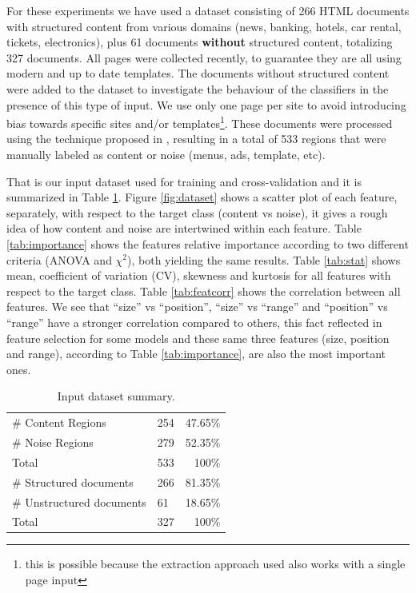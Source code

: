 For these experiments we have used a dataset consisting of 266 HTML documents
with structured content from various domains (news, banking, hotels, car rental,
tickets, electronics), plus 61 documents \textbf{without} structured content,
totalizing 327 documents. All pages were collected recently, to guarantee they
are all using modern and up to date templates. The documents without structured
content were added to the dataset to investigate the behaviour of the
classifiers in the presence of this type of input.
We use only one page per site to avoid introducing bias towards specific sites
and/or templates\footnote{this is possible because the extraction approach used
also works with a single page input}. These documents were processed using the
technique proposed in \cite{Velloso:2017:ERW:3132847.3132875}, resulting in a
total of 533 regions that were manually labeled as content or noise (menus, ads,
template, etc). 

That is our input dataset used for training and cross-validation
and it is summarized in Table \ref{tab:dataset}.
Figure \ref{fig:dataset} shows a scatter plot of each feature, separately, with
respect to the target class (content vs noise), it gives a rough idea of how
content and noise are intertwined within each feature.
Table \ref{tab:importance} shows the features relative importance according to
two different criteria (ANOVA and $\chi^2$), both yielding the same results.
Table \ref{tab:stat} shows mean, coefficient of variation (CV), skewness and
kurtosis for all features with respect to the target class. 
Table \ref{tab:featcorr} shows the correlation between all features. We see that
``size'' vs ``position'', ``size'' vs ``range'' and ``position'' vs ``range''
have a stronger correlation compared to others, this fact reflected in feature
selection for some models and these same three features (size, position and
range), according to Table \ref{tab:importance}, are also the most important
ones.

 
\begin{table}[h]
\centering
\caption{Input dataset summary.}
\label{tab:dataset}
\begin{tabular}{ | l | l | r |}
\hline
\# Content Regions & 254 & 47.65\% \\
\# Noise Regions & 279 & 52.35\% \\
\hline
Total & 533 & 100\% \\
\hline
\# Structured documents & 266 & 81.35\% \\
\# Unstructured documents & 61 & 18.65\% \\
\hline
Total & 327 & 100\% \\
\hline
\end{tabular}
\end{table}

